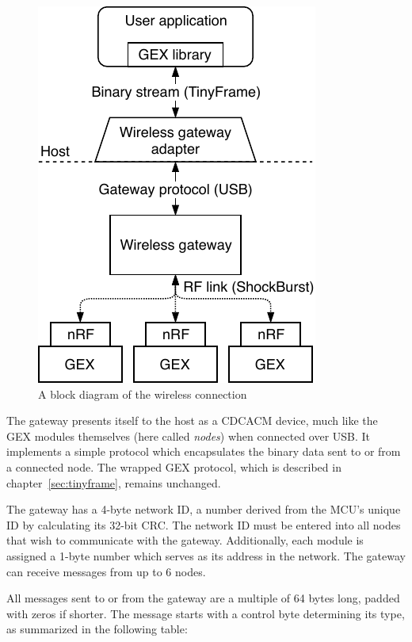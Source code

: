 \begin{figure}
	\vspace{-1em}
	\centering
	\includegraphics[scale=0.9]{img/rf-gw.pdf}
	\caption{A block diagram of the wireless connection}
\end{figure}

The gateway presents itself to the host as a \gls{CDCACM} device, much like the GEX modules themselves (here called \textit{nodes}) when connected over \gls{USB}. It implements a simple protocol which encapsulates the binary data sent to or from a connected node. The wrapped GEX protocol, which is described in chapter~\ref{sec:tinyframe}, remains unchanged.

The gateway has a 4-byte network ID, a number derived from the \gls{MCU}'s unique ID by calculating its 32-bit \gls{CRC}. The network ID must be entered into all nodes that wish to communicate with the gateway. Additionally, each module is assigned a 1-byte number which serves as its address in the network. The gateway can receive messages from up to 6 nodes.

All messages sent to or from the gateway are a multiple of 64 bytes long, padded with zeros if shorter. The message starts with a control byte determining its type, as summarized in the following table:

